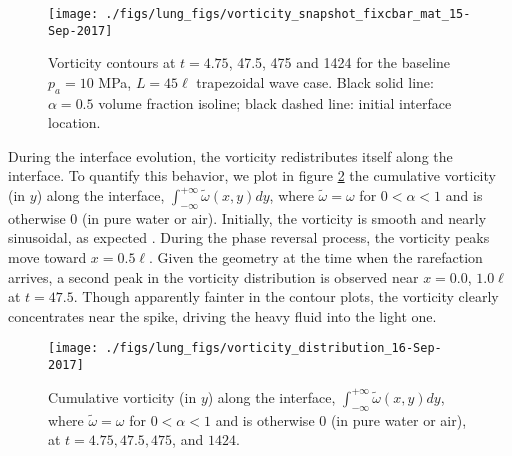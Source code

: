 \begin{figure}
  \centering
  \texttt{[image: ./figs/lung\_figs/vorticity\_snapshot\_fixcbar\_mat\_15-Sep-2017]}
  \caption[The evolution of the vorticity] {Vorticity contours at $t =
    4.75$, 47.5, 475 and 1424 for the baseline $p_a = 10$ MPa, $L=45
    \ell$ trapezoidal wave case. Black solid line: $\alpha=0.5$ volume
    fraction isoline; black dashed line: initial interface location.}
  \label{fig:vorticity_snapshots}
\end{figure}


During the interface evolution, the vorticity redistributes itself
along the interface. To quantify this behavior, we plot in figure
\ref{fig:vorticity_distribution} the cumulative vorticity (in $y$)
along the interface, $ \int_{-\infty}^{+\infty} \tilde{\omega}(x,y) dy
$, where $\tilde{\omega} = \omega$ for $0 < \alpha < 1$ and is
otherwise $0$ (in pure water or air). Initially, the vorticity is smooth and nearly
sinusoidal, as expected \citep{Samtaney1994}.  During the
phase reversal process, the vorticity peaks move toward
$x=0.5\ell$. Given the geometry at the time when the rarefaction
arrives, a second peak in the vorticity distribution is observed near
$x=0.0$, $1.0\ell$ at $t=47.5$. Though apparently fainter in the
contour plots, the vorticity clearly concentrates near the spike,
driving the heavy fluid into the light one.

\begin{figure}
  \centering
  \texttt{[image: ./figs/lung\_figs/vorticity\_distribution\_16-Sep-2017]}
  \caption{Cumulative vorticity (in $y$) along the interface, $
    \int_{-\infty}^{+\infty} \tilde{\omega}(x,y) dy $, where
    $\tilde{\omega} = \omega$ for $0 < \alpha < 1$ and is otherwise
    $0$ (in pure water or air), at $t=4.75, 47.5, 475$, and $1424$.}
  \label{fig:vorticity_distribution}
\end{figure}


